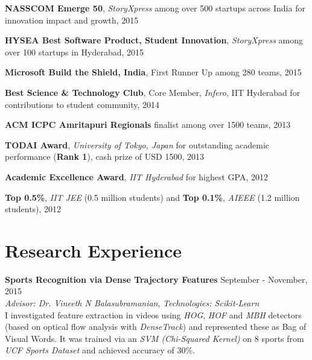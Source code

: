 \documentclass[margin,line]{res}
\begin{document}
\begin{resume}
  \vspace*{-2.5mm}

  {\bf NASSCOM Emerge 50}, {\it StoryXpress} among over 500 startups across India for innovation impact and growth, 2015

  \vspace*{-2.5mm}

  {\bf HYSEA Best Software Product, Student Innovation}, {\it StoryXpress} among over 100 startups in Hyderabad, 2015

  \vspace*{-2.5mm}

  {\bf Microsoft Build the Shield, India}, First Runner Up among 280 teams, 2015

  \vspace*{-2.5mm}

  {\bf Best Science \& Technology Club}, Core Member, {\it Infero}, IIT Hyderabad for contributions to student community, 2014

  \vspace*{-2.5mm}

  {\bf ACM ICPC Amritapuri Regionals} finalist among over 1500 teams, 2013

  \vspace*{-2.5mm}

  {\bf TODAI Award}, {\it University of Tokyo, Japan} for outstanding academic performance ({\bf Rank 1}), cash prize of USD 1500, 2013

  \vspace*{-2.5mm}

  {\bf Academic Excellence Award}, {\it IIT Hyderabad} for highest GPA, 2012

  \vspace*{-2.5mm}

  {\bf Top 0.5\%}, {\it IIT JEE} (0.5 million students) and {\bf Top 0.1\%}, {\it AIEEE} (1.2 million students), 2012

\section{\sc Research Experience}

  {\bf Sports Recognition via Dense Trajectory Features} \hfill September - November, 2015 \\
  	{\em Advisor: Dr. Vineeth N Balasubramanian}, {\em Technologies: Scikit-Learn} \vspace{0.15 \baselineskip} \\
    I investigated feature extraction in videos using {\it HOG}, {\it HOF} and {\it MBH} detectors (based on optical flow analysis with {\it DenseTrack}) and represented these as Bag of Visual Words. It was trained via an {\it SVM (Chi-Squared Kernel)} on 8 sports from {\it UCF Sports Dataset} and achieved accuracy of 30\%.


\end{resume}
\end{document}
